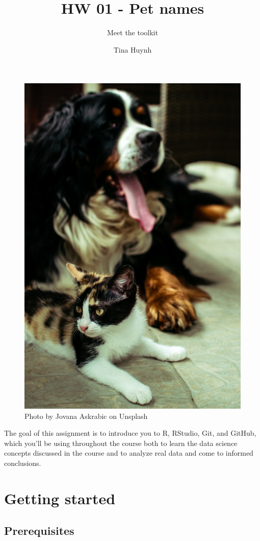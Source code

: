 \documentclass[
]{article}
\title{HW 01 - Pet names}
\subtitle{Meet the toolkit}
\author{Tina Huynh}
\date{}
\begin{document}
\maketitle

{
\setcounter{tocdepth}{2}
\tableofcontents
}
\begin{figure}
\includegraphics[width=0.8\linewidth]{img/jovana-askrabic-XYIQXLH_v0o-unsplash} \caption{Photo by Jovana Askrabic on Unsplash}\label{fig:photo}
\end{figure}

The goal of this assignment is to introduce you to R, RStudio, Git, and
GitHub, which you'll be using throughout the course both to learn the
data science concepts discussed in the course and to analyze real data
and come to informed conclusions.

\section{Getting started}\label{getting-started}

\subsection{Prerequisites}\label{prerequisites}
\end{document}
